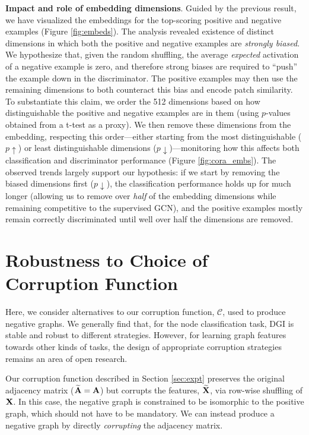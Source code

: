 \documentclass{article} \usepackage{iclr2019_conference,times}
\newcommand{\xhdr}[1]{{\noindent\bfseries #1}.}
\begin{document}
\xhdr{Impact and role of embedding dimensions}
Guided by the previous result, we have visualized the embeddings for the top-scoring positive and negative examples (Figure \ref{fig:embeds}). The analysis revealed existence of distinct dimensions in which both the positive and negative examples are \emph{strongly biased}. We hypothesize that, given the random shuffling, the average \emph{expected} activation of a negative example is zero, and therefore strong biases are required to ``push'' the example down in the discriminator. The positive examples may then use the remaining dimensions to both counteract this bias and encode patch similarity. To substantiate this claim, we order the 512 dimensions based on how distinguishable the positive and negative examples are in them (using $p$-values obtained from a t-test as a proxy). We then remove these dimensions from the embedding, respecting this order---either starting from the most distinguishable ($p\uparrow$) or least distinguishable dimensions ($p\downarrow$)---monitoring how this affects both classification and discriminator performance (Figure \ref{fig:cora_embs}). The observed trends largely support our hypothesis: if we start by removing the biased dimensions first ($p\downarrow$), the classification performance holds up for much longer (allowing us to remove over \emph{half} of the embedding dimensions while remaining competitive to the supervised GCN), and the positive examples mostly remain correctly discriminated until well over half the dimensions are removed.

\section{Robustness to Choice of Corruption Function}\label{app: corruption}
Here, we consider alternatives to our corruption function, $\mathcal{C}$, used to produce negative graphs. We generally find that, for the node classification task, DGI is stable and robust to different strategies. However, for learning graph features towards other kinds of tasks, the design of appropriate corruption strategies remains an area of open research.  

Our corruption function described in Section \ref{sec:expt} preserves the original adjacency matrix (${\bf \widetilde{A}} = {\bf A}$) but corrupts the features, $\bf \widetilde{X}$, via row-wise shuffling of ${\bf X}$. In this case, the negative graph is constrained to be isomorphic to the positive graph, which should not have to be mandatory. We can instead produce a negative graph by directly \emph{corrupting} the adjacency matrix.  
\end{document}
